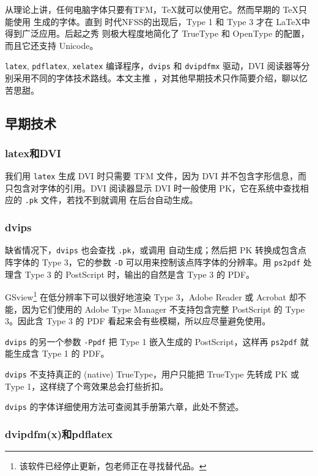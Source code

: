 从理论上讲，任何电脑字体只要有TFM，\TeX 就可以使用它。然而早期的 \TeX 只能使用 \MF 生成的字体。直到 \LaTeXe 时代NFSS的出现后，Type 1 和 Type 3 才在 \LaTeX 中得到广泛应用。后起之秀 \XeTeX 则极大程度地简化了 TrueType 和 OpenType 的配置，而且它还支持 Unicode。

\texttt{latex}, \texttt{pdflatex}, \texttt{xelatex} 编译程序，\texttt{dvips} 和 \texttt{dvipdfmx} 驱动，DVI 阅读器等分别采用不同的字体技术路线。本文主推 \XeLaTeX ，对其他早期技术只作简要介绍，聊以忆苦思甜。

\subsection{早期技术}

\subsubsection{latex和DVI}

我们用 \texttt{latex} 生成 DVI 时只需要 TFM 文件，因为 DVI 并不包含字形信息，而只包含对字体的引用。DVI 阅读器显示 DVI 时一般使用 PK，它在系统中查找相应的 \texttt{.pk} 文件，若找不到就调用 \MF 在后台自动生成。

\subsubsection{dvips}

缺省情况下，\texttt{dvips} 也会查找 \texttt{.pk}，或调用 \MF 自动生成；然后把 PK 转换成包含点阵字体的 Type 3，它的参数 \texttt{-D} 可以用来控制该点阵字体的分辨率。用 \texttt{ps2pdf} 处理含 Type 3 的 PostScript 时，输出的自然是含 Type 3 的 PDF。

GSview\footnote{该软件已经停止更新，包老师正在寻找替代品。} 在低分辨率下可以很好地渲染 Type 3，Adobe Reader 或 Acrobat 却不能，因为它们使用的 Adobe Type Manager 不支持包含完整 PostScript 的 Type 3。因此含 Type 3 的 PDF 看起来会有些模糊，所以应尽量避免使用。

\texttt{dvips} 的另一个参数 \texttt{-Ppdf} 把 Type 1 嵌入生成的 PostScript，这样再 \texttt{ps2pdf} 就能生成含 Type 1 的 PDF。

\texttt{dvips} 不支持真正的 (native) TrueType，用户只能把 TrueType 先转成 PK 或 Type 1，这样绕了个弯效果总会打些折扣。

\texttt{dvips} 的字体详细使用方法可查阅其手册\citep{Rokicki_dvips}第六章，此处不赘述。

\subsubsection{dvipdfm(x)和pdflatex}

